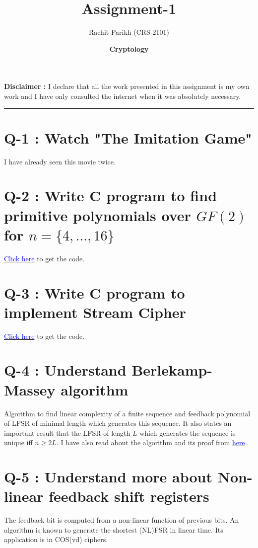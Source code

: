 \documentclass[14pt]{article}
\begin{document}
	
	\title{\color{blue}\Huge \textbf{Assignment-1}} 
	\date{\Large \textbf{Cryptology}}
	\author{Rachit Parikh (CRS-2101)}
	
	\maketitle
	\textbf{Disclaimer : }I declare that all the work presented in this assignment is my own work and I have only consulted the internet when it was absolutely necessary. 
	
	\noindent
	\rule{\linewidth}{0.4pt}
	
	\section*{Q-1 : Watch "The Imitation Game"}
		\noindent
		I have already seen this movie twice.\\
		
	\section*{Q-2 : Write C program to find primitive polynomials over $GF(2)$ for $n = \{4, \dots ,16\}$}
		\noindent
		\href{https://github.com/motabha1/cryptology-classwork/tree/main/assignments/assignment-1/code/primitive-polynomials}{\textcolor{blue}{Click here}} to get the code.\\
	\section*{Q-3 : Write C program to implement Stream Cipher}
		\noindent
		\href{https://github.com/motabha1/cryptology-classwork/tree/main/assignments/assignment-1/code/stream-cipher}{\textcolor{blue}{Click here}} to get the code.\\
	\section*{Q-4 : Understand Berlekamp-Massey algorithm}
		\noindent
		Algorithm to find linear complexity of a finite sequence and feedback polynomial of LFSR of minimal length which generates this sequence. It also states an important result that the LFSR of length $L$ which generates the sequence is unique iff $n \geq 2L$. I have also read about the algorithm and its proof from \href{https://www-users.cse.umn.edu/~garrett/students/reu/MB_algorithm.pdf}{\textcolor{blue}{here}}.
	\section*{Q-5 : Understand more about Non-linear feedback shift registers}
		\noindent
		The feedback bit is computed from a non-linear function of previous bits. An algorithm is known to generate the shortest (NL)FSR in linear time. Its application is in COS(vd) ciphers.
	
\end{document}
